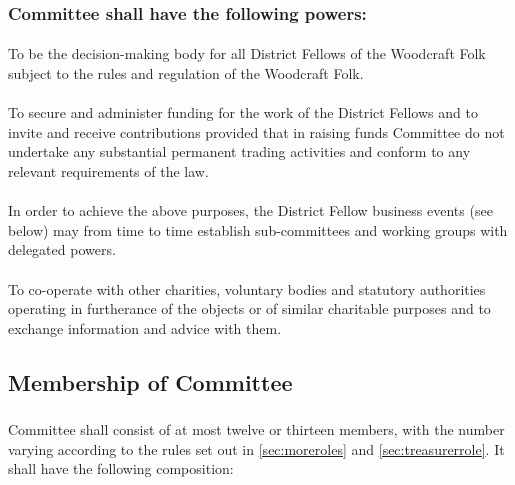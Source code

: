\documentclass[a4paper, 12pt]{article}
\begin{document}
\subsubsection{Committee shall have the following powers:}
\paragraph{}
To be the decision-making body for all District Fellows of the Woodcraft Folk subject to the rules and regulation of the Woodcraft Folk.
\paragraph{}
To secure and administer funding for the work of the District Fellows and to invite and receive contributions provided that in raising funds Committee do not undertake any substantial permanent trading activities and conform to any relevant requirements of the law.
\paragraph{}
In order to achieve the above purposes, the District Fellow business events (see below) may from time to time establish sub-committees and working groups with delegated powers.
\paragraph{}
To co-operate with other charities, voluntary bodies and statutory authorities operating in furtherance of the objects or of similar charitable purposes and to exchange information and advice with them.

\subsection{Membership of Committee}
\subsubsection{}
\label{sec:cttemembership}
Committee shall consist of at most twelve or thirteen members, with the number varying according to the rules set out in \ref{sec:moreroles} and \ref{sec:treasurerrole}. It shall have the following composition:
\end{document}
